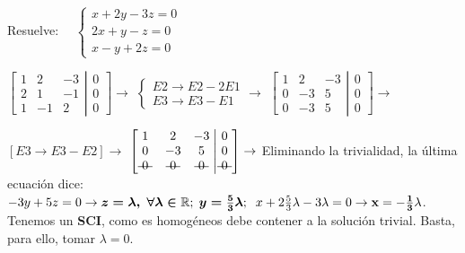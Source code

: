 \begin{ejre} 
Resuelve: $\quad \begin{cases} x+2y-3z=0\\2x+y-z=0\\x-y+2z=0  \end{cases}$ 
\end{ejre}
\begin{proofw}\renewcommand{\qedsymbol}{$\diamond$}
$\left[ \begin{matrix}
  1 & 2 & -3 \\ 2 & 1 & -1 \\ 1 & -1 & 2 
 \end{matrix}\right. 
 \left| \begin{matrix}
  0 \\ 0 \\ 0 
 \end{matrix}\right] \to $
 \textcolor{gris}{$\begin{cases} E2 \to E2-2E1 \\ E3 \to E3-E1  \end{cases} \to $}
 $\left[ \begin{matrix}
  1 & 2 & -3 \\ 0 & -3 & 5 \\ 0 & -3 & 5 
 \end{matrix}\right. 
 \left| \begin{matrix}
  0 \\ 0 \\ 0 
 \end{matrix}\right] \to $
 
 \noindent \textcolor{gris}{$[ E3 \to E3-E2] \to$}
  $\left[ \begin{matrix}
  1 & 2 & -3 \\ 0 & -3 & 5 \\ \text{\textst{ 0 }} 
 & \text{\textst{ 0 }} 
 & \text{\textst{ 0 }} 
 
 \end{matrix}\right. 
 \left| \begin{matrix}
  0 \\ 0 \\ \text{\textst{ 0 }} 
 \end{matrix}\right] \to $ Eliminando la trivialidad, la última ecuación dice: $-3y+5z=0 \to \boldsymbol{z=\lambda , \; \forall \lambda \in \mathbb R} ;\; \boldsymbol{y=\frac 5 3 \lambda}; \; \; x+2 \frac 5 3 \lambda -3\lambda =0 \to \bold{x=-\frac 1 3 \lambda} $. Tenemos un \textbf{SCI}, como es homogéneos debe contener a la solución trivial. Basta, para ello, tomar $\lambda=0$.
\end{proofw}


